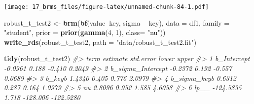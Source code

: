 \documentclass[]{book}
\newenvironment{Shaded}{\begin{snugshade}}{\end{snugshade}}
\newcommand{\CommentTok}[1]{\textcolor[rgb]{0.56,0.35,0.01}{\textit{#1}}}
\newcommand{\DataTypeTok}[1]{\textcolor[rgb]{0.13,0.29,0.53}{#1}}
\newcommand{\DecValTok}[1]{\textcolor[rgb]{0.00,0.00,0.81}{#1}}
\newcommand{\FloatTok}[1]{\textcolor[rgb]{0.00,0.00,0.81}{#1}}
\newcommand{\KeywordTok}[1]{\textcolor[rgb]{0.13,0.29,0.53}{\textbf{#1}}}
\newcommand{\NormalTok}[1]{#1}
\newcommand{\OperatorTok}[1]{\textcolor[rgb]{0.81,0.36,0.00}{\textbf{#1}}}
\newcommand{\StringTok}[1]{\textcolor[rgb]{0.31,0.60,0.02}{#1}}
\begin{document}
\begin{Shaded}
\end{Shaded}

\texttt{[image: 17\_brms\_files/figure-latex/unnamed-chunk-84-1.pdf]}

\begin{Shaded}
\begin{Highlighting}[]
\NormalTok{robust_t_test2 <-}\StringTok{ }\KeywordTok{brm}\NormalTok{(}\KeywordTok{bf}\NormalTok{(value}\OperatorTok{~}\NormalTok{key, sigma }\OperatorTok{~}\StringTok{ }\NormalTok{key), }
            \DataTypeTok{data =}\NormalTok{ df1, }
            \DataTypeTok{family =} \StringTok{"student"}\NormalTok{, }
            \DataTypeTok{prior =} \KeywordTok{prior}\NormalTok{(}\KeywordTok{gamma}\NormalTok{(}\DecValTok{4}\NormalTok{, }\DecValTok{1}\NormalTok{), }\DataTypeTok{class=} \StringTok{"nu"}\NormalTok{))}
\KeywordTok{write_rds}\NormalTok{(robust_t_test2, }\DataTypeTok{path =} \StringTok{"data/robust_t_test2.fit"}\NormalTok{)}
\end{Highlighting}
\end{Shaded}

\begin{Shaded}
\begin{Highlighting}[]
\KeywordTok{tidy}\NormalTok{(robust_t_test2)}
\CommentTok{#>                term  estimate std.error    lower     upper}
\CommentTok{#> 1       b_Intercept   -0.0961     0.188   -0.410    0.2049}
\CommentTok{#> 2 b_sigma_Intercept   -0.2372     0.192   -0.557    0.0689}
\CommentTok{#> 3            b_keyb    1.4340     0.405    0.776    2.0979}
\CommentTok{#> 4      b_sigma_keyb    0.6312     0.287    0.164    1.0979}
\CommentTok{#> 5                nu    2.8096     0.952    1.585    4.6058}
\CommentTok{#> 6              lp__ -124.5835     1.718 -128.006 -122.5280}
\end{Highlighting}
\end{Shaded}
\end{document}
